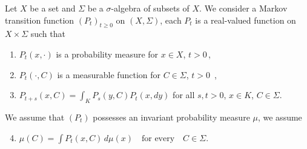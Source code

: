 \begin{example}\label{ex:c4-2.8}
%
Let $X$ be a set and $\Sigma$ be a $\sigma$-algebra of subsets of\/ $X$.
We consider a Markov transition function $(P_{t})_{t \geq 0}$ on $(X,\Sigma)$, \ie  each $P_{t}$ is a real-valued function on $X \times \Sigma$ such that
\begin{enumerate}[\upshape (i)]
\item \label{ex:c4-2.7-1}
$P_{t}(x,\cdot)$ is a probability measure for $x \in X$, $t > 0$\,,

\item \label{ex:c4-2.7-2}
$P_{t}(\cdot,C)$ is a measurable function for $C \in \Sigma$, $t > 0$\, ,

\item \label{ex:c4-2.7-3}
$P_{t+s}(x,C) = \int_{K} P_{s}(y,C)P_{t}(x,dy)$ for all $s,t>0$, $x \in K$, $C \in \Sigma$.
\end{enumerate}
We assume that $(P_{t})$ possesses an invariant probability measure $\mu$, \ie  we assume
\begin{enumerate}[\upshape (i)]
\setcounter{enumi}{3}
\item \label{ex:c4-2.7-4}
$\mu(C) = \int P_{t}(x,C) \, d\mu(x) \quad \text{for every} \quad C \in \Sigma$.
\end{enumerate}


\end{example}
